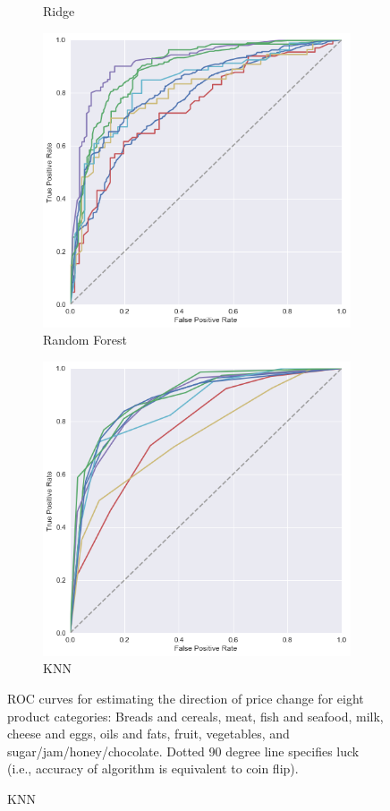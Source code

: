 \documentclass[11pt]{article}
\begin{document}
\begin{figure}[ht]
\begin{subfigure}[b]{0.5\textwidth}
    \caption{Ridge}
  \end{subfigure}
   \begin{subfigure}[d]{0.5\textwidth}
    \includegraphics[width=\textwidth]{random_forest_roc.png}
    \caption{Random Forest}
  \end{subfigure}
  \begin{subfigure}[d]{0.5\textwidth}
    \includegraphics[width=\textwidth]{knn_roc.png}
    \caption{KNN}
  \end{subfigure}
  ROC curves for estimating the direction of price change for eight product categories: Breads and cereals, meat, fish and seafood, milk, cheese and eggs, oils and fats, fruit, vegetables, and sugar/jam/honey/chocolate. Dotted 90 degree line specifies luck (i.e., accuracy of algorithm is equivalent to coin flip).
  \label{Figure 2}
\end{figure}
\end{document}
